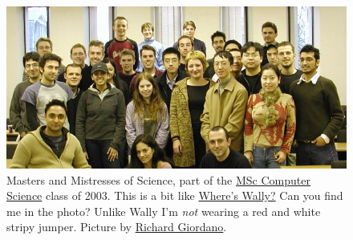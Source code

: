 \documentclass[
]{book}
\begin{document}
\begin{figure}

{\centering \includegraphics[width=1\linewidth]{images/msc-2003} 

}

\caption{Masters and Mistresses of Science, part of the \href{https://web.archive.org/web/20030825205716/http://www.cs.man.ac.uk/Study_subweb/Postgrad/ACS-CS/webpages/handbook/CSHandbook.pdf}{MSc Computer Science} class of 2003. This is a bit like \href{https://en.wikipedia.org/wiki/Where\%27s_Wally\%3F}{Where's Wally?} Can you find me in the photo? Unlike Wally I'm \emph{not} wearing a red and white stripy jumper. Picture by \href{https://www.southampton.ac.uk/healthsciences/about/staff/richard_giordano.page}{Richard Giordano}.}\label{fig:msc-fig}
\end{figure}
\end{document}
